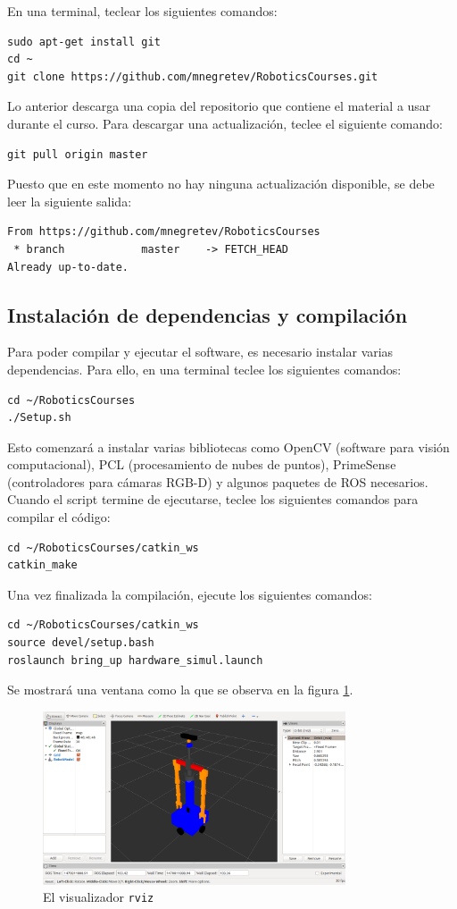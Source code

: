 \documentclass[letterpaper,12pt]{article}
\begin{document}
En una terminal, teclear los siguientes comandos:
\begin{verbatim}
sudo apt-get install git
cd ~
git clone https://github.com/mnegretev/RoboticsCourses.git
\end{verbatim}
Lo anterior descarga una copia del repositorio que contiene el material a usar durante el curso. Para descargar una actualización, teclee el siguiente comando:
\begin{verbatim}
git pull origin master
\end{verbatim}
Puesto que en este momento no hay ninguna actualización disponible, se debe leer la siguiente salida:
\begin{verbatim}
From https://github.com/mnegretev/RoboticsCourses
 * branch            master    -> FETCH_HEAD
Already up-to-date.
\end{verbatim}

\subsection{Instalación de dependencias y compilación}
Para poder compilar y ejecutar el software, es necesario instalar varias dependencias. Para ello, en una terminal teclee los siguientes comandos:
\begin{verbatim}
cd ~/RoboticsCourses
./Setup.sh
\end{verbatim}

Esto comenzará a instalar varias bibliotecas como OpenCV (software para visión computacional), PCL (procesamiento de nubes de puntos), PrimeSense (controladores para cámaras RGB-D) y algunos paquetes de ROS necesarios. Cuando el script termine de ejecutarse, teclee los siguientes comandos para compilar el código:
\begin{verbatim}
cd ~/RoboticsCourses/catkin_ws
catkin_make
\end{verbatim}

Una vez finalizada la compilación, ejecute los siguientes comandos:

\begin{verbatim}
cd ~/RoboticsCourses/catkin_ws
source devel/setup.bash
roslaunch bring_up hardware_simul.launch
\end{verbatim}

Se mostrará una ventana como la que se observa en la figura \ref{fig:rviz}.
\begin{figure}
\centering
\includegraphics[width=0.8\textwidth]{rviz_initial.png}
\caption{El visualizador \texttt{rviz}}
\label{fig:rviz}
\end{figure}
\end{document}
